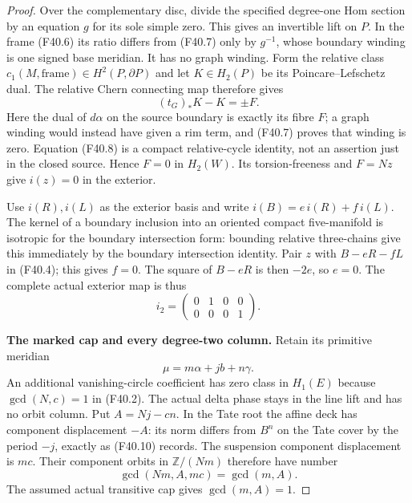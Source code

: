 \begin{proof}
Over the complementary disc, divide the specified degree-one
Hom section by an equation $g$ for its sole simple zero. This
gives an invertible lift on $P$. In the frame (F40.6) its ratio
differs from (F40.7) only by $g^{-1}$, whose boundary winding
is one signed base meridian. It has no graph winding. Form
the relative class $c_1(M,\text{frame})\in H^2(P,\partial P)$
and let $K\in H_2(P)$ be its Poincare--Lefschetz dual. The
relative Chern connecting map therefore gives
\[
                        (t_G)_*K-K=\pm F.              \tag{F40.8}
\]
Here the dual of $d\alpha$ on the source boundary is exactly
its fibre $F$; a graph winding would instead have given a rim
term, and (F40.7) proves that winding is zero. Equation (F40.8)
is a compact relative-cycle identity, not an assertion just in
the closed source. Hence $F=0$ in $H_2(W)$. Its torsion-freeness
and $F=Nz$ give $i(z)=0$ in the exterior.

Use $i(R),i(L)$ as the exterior basis and write
$i(B)=e\,i(R)+f\,i(L)$. The kernel of a boundary inclusion
into an oriented compact five-manifold is isotropic for the
boundary intersection form: bounding relative three-chains
give this immediately by the boundary intersection identity.
Pair $z$ with $B-eR-fL$ in (F40.4); this gives $f=0$.
The square of $B-eR$ is then $-2e$, so $e=0$. The complete
actual exterior map is thus
\[
                 i_2=\begin{pmatrix}0&1&0&0\\0&0&0&1\end{pmatrix}.
                                                               \tag{F40.9}
\]

\par\medskip\noindent\textbf{The marked cap and every degree-two column.}
Retain its primitive meridian
\[
                     \mu=m\alpha+jb+n\gamma.          \tag{F40.10}
\]
An additional vanishing-circle coefficient has zero class in
$H_1(E)$ because $\gcd(N,c)=1$ in (F40.2). The actual delta
phase stays in the line lift and has no orbit column.
Put $A=Nj-cn$. In the Tate root the affine deck has component
displacement $-A$: its norm differs from $B^n$ on the Tate
cover by the period $-j$, exactly as (F40.10) records. The
suspension component displacement is $mc$. Their component
orbits in $\mathbb Z/(Nm)$ therefore have number
\[
           \gcd(Nm,A,mc)=\gcd(m,A).
\]
The assumed actual transitive cap gives $\gcd(m,A)=1$.


\end{proof}
